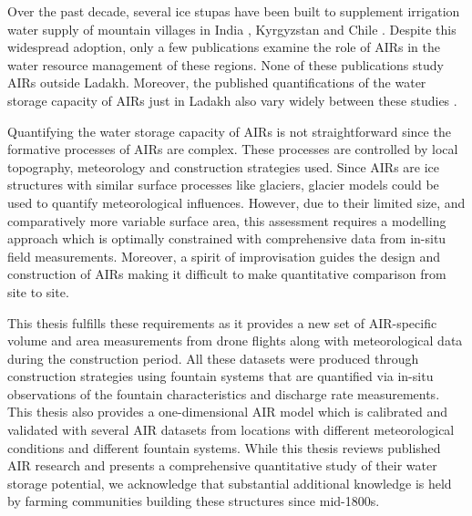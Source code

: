 Over the past decade, several ice stupas have been built to supplement irrigation water supply of mountain
villages in India \citep{wangchukIceStupaCompetition2020, palmerStoringFrozenWater2022,
aggarwalAdaptationClimateChange2021}, Kyrgyzstan \citep{bbcnewsBrightArtificialGlacier2020} and Chile
\citep{reutersConservationistsChileAim2021}. Despite this widespread adoption, only a few publications examine
the role of AIRs in the water resource management of these regions. None of these publications study AIRs
outside Ladakh. Moreover, the published quantifications of the water storage capacity of AIRs just in Ladakh
also vary widely between these studies \citep{norphelSnowWaterHarvesting2015, baglaArtificialGlaciersHelp1998}.

Quantifying the water storage capacity of AIRs is not straightforward since the formative processes of AIRs are
complex. These processes are controlled by local topography, meteorology and construction strategies used. Since
AIRs are ice structures with similar surface processes like glaciers, glacier models could be used to quantify
meteorological influences. However, due to their limited size, and comparatively more variable surface area,
this assessment requires a modelling approach which is optimally constrained with comprehensive data from
in-situ field measurements. Moreover, a spirit of improvisation guides the design and construction of AIRs
making it difficult to make quantitative comparison from site to site.  

This thesis fulfills these requirements as it provides a new set of AIR-specific volume and area measurements
from drone flights along with meteorological data during the construction period. All these datasets were
produced through construction strategies using fountain systems that are quantified via in-situ observations of
the fountain characteristics and discharge rate measurements. This thesis also provides a one-dimensional AIR
model which is calibrated and validated with several AIR datasets from locations with different meteorological
conditions and different fountain systems. While this thesis reviews published AIR research and presents a
comprehensive quantitative study of their water storage potential, we acknowledge that substantial additional
knowledge is held by farming communities building these structures since mid-1800s.

